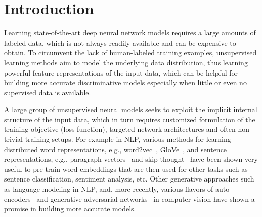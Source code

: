 \documentclass[sigconf]{acmart}
\newcommand{\shrink}{\vspace{-1.5ex}}
\newcommand{\sshrink}{\vspace{-.80ex}}
\begin{document}




\maketitle

\section{Introduction}
Learning state-of-the-art deep neural network models requires a large amounts of labeled data, which is not always readily available and can be expensive to obtain. To circumvent the lack of human-labeled training examples, unsupervised learning methods aim to model the underlying data distribution, thus learning powerful feature representations of the input data, which can be helpful for building more accurate discriminative models especially when little or even no supervised data is available.

A large group of unsupervised neural models seeks to exploit the implicit internal structure of the input data, which in turn requires customized formulation of the training objective (loss function), targeted network architectures and often non-trivial training setups. 
For example in NLP, various methods for learning distributed word representations, e.g., word2vec~\citep{Mikolov:2013}, GloVe~\citep{Pennington:2014}, and sentence representations, e.g., paragraph vectors~\citep{Le:2014} and skip-thought~\citep{Kiros:2015} have been shown very useful to pre-train word embeddings that are then used for other tasks such as sentence classification, sentiment analysis, etc.
Other generative approaches such as language modeling in NLP, and, more recently, various flavors of auto-encoders~\citep{Baldi:2012} and generative adversarial networks~\citep{Goodfellow:2014} in computer vision have shown a promise in building more accurate models.
\end{document}
